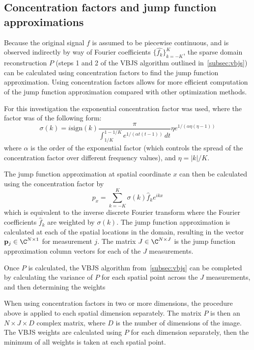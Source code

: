 \documentclass{article}
\begin{document}
\subsection{Concentration factors and jump function approximations}

Because the original signal $f$ is assumed to be piecewise continuous, and is observed indirectly by way of Fourier coefficients $\{\hat{f_k}\}_{k=-K}^K$, the sparse domain reconstruction $P$ (steps 1 and 2 of the VBJS algorithm outlined in~\ref{subsec:vbjs}) can be calculated using concentration factors to find the jump function approximation. Using concentration factors allows for more efficient computation of the jump function approximation compared with other optimization methods.

For this investigation the exponential concentration factor was used, where the factor was of the following form:
\begin{equation}\label{eq:conc_factor}
    \sigma(k) = i \text{sign}(k) \frac{\pi}{\int_{1/K}^{1-1/K} e^{1/(\alpha t (t-1))} \, dt} \eta e^{1/(\alpha \eta (\eta-1))}
\end{equation}
where $\alpha$ is the order of the exponential factor (which controls the spread of the concentration factor over different frequency values), and $\eta = |k|/K$.

The jump function approximation at spatial coordinate $x$ can then be calculated using the concentration factor by
\[
p_{x} = \sum_{k=-K}^K \sigma(k) \hat{f}_k e^{ikx}
\]
which is equivalent to the inverse discrete Fourier transform where the Fourier coefficients $\hat{f}_k$ are weighted by $\sigma(k)$. The jump function approximation is calculated at each of the spatial locations in the domain, resulting in the vector $\mathbf{p}_j \in \C^{N \times 1}$ for measurement $j$. The matrix $J \in \C^{N \times J}$ is the jump function approximation  column vectors for each of the $J$ measurements.

Once $P$ is calculated, the VBJS algorithm from~\ref{subsec:vbjs} can be completed by calculating the variance of $P$ for each spatial point across the $J$ measurements, and then determining the weights

When using concentration factors in two or more dimensions, the procedure above is applied to each spatial dimension separately. The matrix $P$ is then an $N \times J \times D$ complex matrix, where $D$ is the number of dimensions of the image. The VBJS weights are calculated using $P$ for each dimension separately, then the minimum of all weights is taken at each spatial point.
\end{document}
